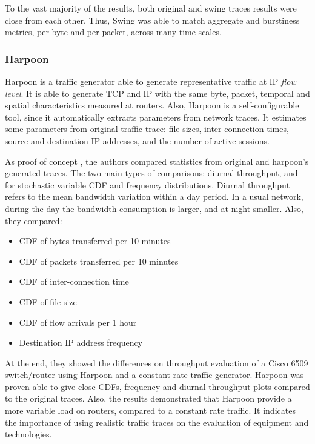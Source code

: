 To the vast majority of the results, both original and swing traces results were close from each other. Thus,  Swing was able to match aggregate and burstiness metrics, per byte and per packet, across many time scales.  


\subsubsection{Harpoon}

Harpoon\cite{harpoon-validation}\cite{harpoon-paper} is a traffic generator able to generate representative traffic at IP \textit{flow level}. It is able to generate TCP and IP with the same byte, packet, temporal and spatial characteristics measured at routers. Also, Harpoon is a self-configurable tool, since it automatically extracts parameters from network traces. It estimates some parameters from original traffic trace: file sizes, inter-connection times, source and destination IP addresses, and the number of active sessions. 

As proof of concept \cite{ harpoon-validation}, the authors compared statistics from original and harpoon's generated traces. The two main types of comparisons: diurnal throughput, and for stochastic variable CDF and frequency distributions. Diurnal throughput refers to the mean bandwidth variation within a day period.  In a usual network, during the day the bandwidth consumption is larger, and at night smaller. Also, they compared:

\begin{itemize}
\item CDF of bytes transferred per 10 minutes
\item CDF of packets transferred per 10 minutes
\item CDF of inter-connection time
\item CDF of file size
\item CDF of flow arrivals per 1 hour
\item Destination IP address frequency
\end{itemize}

At the end, they showed the differences on throughput evaluation of a Cisco 6509 switch/router using Harpoon and a constant rate traffic generator.  
Harpoon was proven able to give close CDFs, frequency and diurnal throughput plots compared to the original traces. Also, the results demonstrated that Harpoon provide a more variable load on routers, compared to a constant rate traffic. It indicates the importance of using realistic traffic traces on the evaluation of equipment and technologies. 


